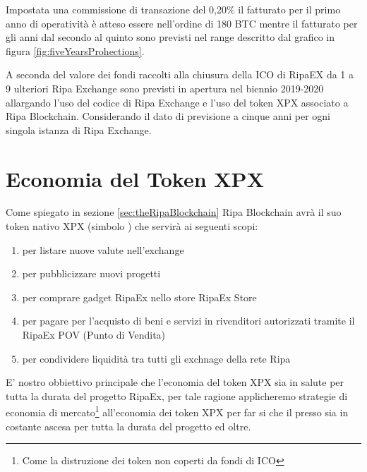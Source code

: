 \documentclass[11pt,fleqn]{book} %
\begin{document}
Impostata una commissione di transazione del 0,20\% il fatturato per il primo anno di operatività è atteso
essere nell'ordine di 180 BTC mentre il fatturato per gli anni dal secondo al quinto sono previsti nel range 
descritto dal grafico in figura \ref{fig:fiveYearsProhections}.
\begin{center}
	\label{fig:fiveYearsProhections}
\end{center}

A seconda del valore dei fondi raccolti alla chiusura della ICO di RipaEX da 1 a 9 ulteriori Ripa Exchange
sono previsti in apertura nel biennio 2019-2020 allargando l'uso del codice di Ripa Exchange e l'uso del token
XPX associato a Ripa Blockchain. Considerando il dato di previsione a cinque anni per ogni singola istanza
di Ripa Exchange.

\section{Economia del Token XPX}
Come spiegato in sezione \ref{sec:theRipaBlockchain} Ripa Blockchain avrà il suo token nativo XPX (simbolo \PHP)
che servirà ai seguenti scopi:
\begin{enumerate}
	\item per listare nuove valute nell'exchange
	\item per pubblicizzare nuovi progetti
	\item per comprare gadget RipaEx nello store RipaEx Store
	\item per pagare per l'acquisto di beni e servizi in rivenditori autorizzati tramite il RipaEx POV (Punto di Vendita)
	\item per condividere liquidità tra tutti gli exchnage della rete Ripa
\end{enumerate}
E' nostro obbiettivo principale che l'economia del token XPX sia in salute per tutta la durata del progetto RipaEx,
per tale ragione applicheremo strategie di economia di mercato\footnote{Come la distruzione dei token non coperti
da fondi di ICO} all'economia dei token XPX per far si che il presso sia in costante ascesa per tutta la durata
del progetto ed oltre.
\end{document}
